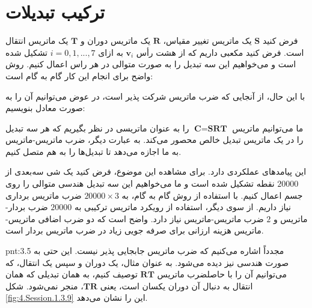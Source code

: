 \section{\textbf{ترکیب تبدیلات}}
\label{sec:3.3}
{
    \Large
    \begin{spacing}{1.5}
        فرض کنید $\textbf{S}$ یک ماتریس تغییر مقیاس، $\textbf{R}$ یک ماتریس دوران و $\textbf{T}$ یک ماتریس انتقال است.
        فرض کنید مکعبی داریم که از هشت رأس $\textbf{v}_{i}$ به ازای $i=0,1,...,7$ تشکیل شده است و
        می‌خواهیم این سه تبدیل را به صورت متوالی در هر راس اعمال کنیم. روش واضح برای انجام این کار گام به گام است:

        \begin{center}
        \end{center}

        با این حال، از آنجایی که ضرب ماتریس شرکت پذیر است، در عوض می‌توانیم آن را به صورت معادل بنویسیم:

        \begin{center}
        \end{center}

        ما می‌توانیم ماتریس $\textbf{C}=\textbf{SRT}$ را به عنوان ماتریسی در نظر بگیریم که هر سه تبدیل را در یک ماتریس تبدیل خالص محصور می‌کند.
        به عبارت دیگر، ضرب ماتریس-ماتریس به ما اجازه می‌دهد تا تبدیل‌ها را به هم متصل کنیم.

        این پیامدهای عملکردی دارد. برای مشاهده این موضوع، فرض کنید یک شی سه‌بعدی از $20000$ نقطه تشکیل شده است و ما می‌خواهیم این سه تبدیل هندسی متوالی را روی جسم اعمال کنیم.
        با استفاده از روش گام به گام، به $20000\times 3$ ضرب ماتریس برداری نیاز داریم.
        از سوی دیگر، استفاده از رویکرد ماتریس ترکیبی به $20000$ ضرب بردار-ماتریس و $2$ ضرب ماتریس-ماتریس نیاز دارد. واضح است که دو ضرب اضافی ماتریس-ماتریس هزینه ارزانی برای صرفه جویی زیاد در ضرب ماتریس بردار است.

        \begin{point}{pnt:3.5}
            \Large
            مجدداً اشاره می‌کنیم که ضرب ماتریس جابجایی پذیر نیست. این حتی به صورت هندسی نیز دیده می‌شود.
            به عنوان مثال، یک دوران و سپس یک انتقال، که می‌توانیم آن را با حاصلضرب ماتریس $\textbf{RT}$ توصیف کنیم، به همان تبدیلی که همان انتقال به دنبال آن دوران یکسان است، یعنی $\textbf{TR}$، منجر نمی‌شود. شکل \ref{fig:4.Session.1.3.9} این را نشان می‌دهد.
        \end{point}


\end{spacing}}
